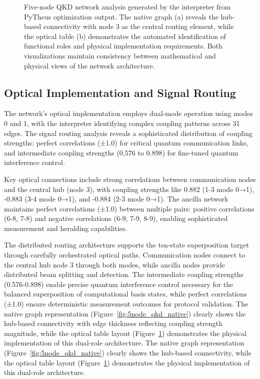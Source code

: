 \documentclass[11pt,a4paper]{article}
\begin{document}
\begin{figure}[htbp]
\begin{subfigure}{0.45\textwidth}
\label{fig:5node_qkd_optical}
\end{subfigure}
\caption{Five-node QKD network analysis generated by the interpreter from PyTheus optimization output. The native graph (a) reveals the hub-based connectivity with node 3 as the central routing element, while the optical table (b) demonstrates the automated identification of functional roles and physical implementation requirements. Both visualizations maintain consistency between mathematical and physical views of the network architecture.}
\label{fig:5node_qkd_analysis}
\end{figure}

\subsection{Optical Implementation and Signal Routing}

The network's optical implementation employs dual-mode operation using modes 0 and 1, with the interpreter identifying complex coupling patterns across 31 edges. The signal routing analysis reveals a sophisticated distribution of coupling strengths: perfect correlations (±1.0) for critical quantum communication links, and intermediate coupling strengths (0.576 to 0.898) for fine-tuned quantum interference control.

Key optical connections include strong correlations between communication nodes and the central hub (node 3), with coupling strengths like 0.882 (1-3 mode 0→1), -0.883 (3-4 mode 0→1), and -0.884 (2-3 mode 0→1). The ancilla network maintains perfect correlations (±1.0) between multiple pairs: positive correlations (6-8, 7-8) and negative correlations (6-9, 7-9, 8-9), enabling sophisticated measurement and heralding capabilities.

The distributed routing architecture supports the ten-state superposition target through carefully orchestrated optical paths. Communication nodes connect to the central hub node 3 through both modes, while ancilla nodes provide distributed beam splitting and detection. The intermediate coupling strengths (0.576-0.898) enable precise quantum interference control necessary for the balanced superposition of computational basis states, while perfect correlations (±1.0) ensure deterministic measurement outcomes for protocol validation. The native graph representation (Figure~\ref{fig:5node_qkd_native}) clearly shows the hub-based connectivity with edge thickness reflecting coupling strength magnitude, while the optical table layout (Figure~\ref{fig:5node_qkd_optical}) demonstrates the physical implementation of this dual-role architecture. The native graph representation (Figure~\ref{fig:5node_qkd_native}) clearly shows the hub-based connectivity, while the optical table layout (Figure~\ref{fig:5node_qkd_optical}) demonstrates the physical implementation of this dual-role architecture.
\end{document}
